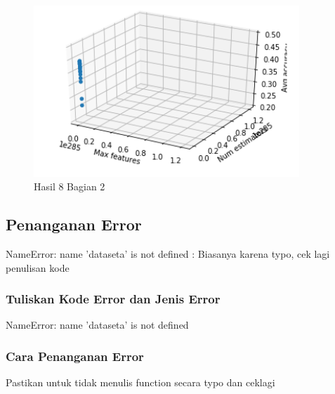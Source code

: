 
\begin{figure}[H]
\centerline{\includegraphics[width=10cm]{figures/1174089/3/praktek32.PNG}}
\caption{Hasil 8 Bagian 2}
\label{labelgambar}
\end{figure}


\subsection{Penanganan Error}
NameError: name 'dataseta' is not defined : Biasanya karena typo, cek lagi penulisan kode

\subsubsection{Tuliskan Kode Error dan Jenis Error}
NameError: name 'dataseta' is not defined

\subsubsection{Cara Penanganan Error}
Pastikan untuk tidak menulis function secara typo dan ceklagi

